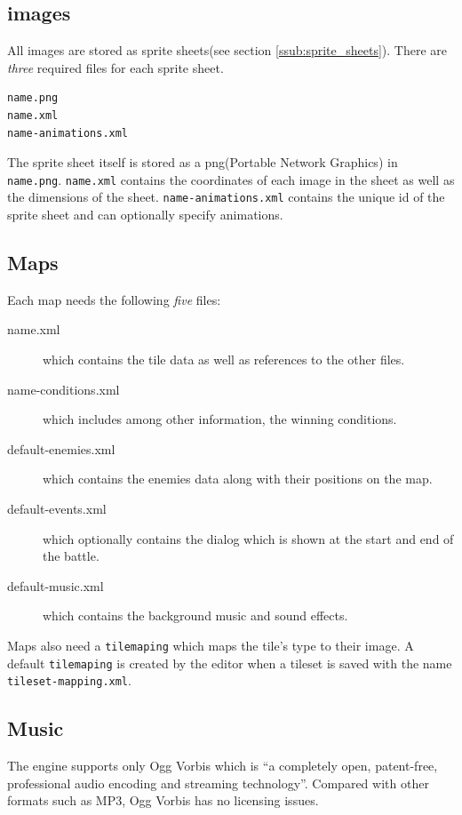 \subsection{images}
All images are stored as sprite sheets(see section \ref{ssub:sprite_sheets}).  There are \emph{three} required files for each sprite sheet. 
\begin{lstlisting}
name.png
name.xml
name-animations.xml
\end{lstlisting}
The sprite sheet itself is stored as  a png(Portable Network Graphics) in \texttt{name.png}. \texttt{name.xml} contains the coordinates of each image in the sheet as well as the dimensions of the sheet. \texttt{name-animations.xml} contains the unique id of the sprite sheet and can optionally specify animations. 

\subsection{Maps}
\label{sub:amaps}

Each map needs the following \emph{five} files:
\begin{description}
	\item[name.xml] which contains the tile data as well as references to the other files. 
	\item[name-conditions.xml]  which includes among other information, the  winning conditions. 
	\item[default-enemies.xml]  which contains the enemies data along with their positions on the map.
	\item[default-events.xml]   which optionally contains the dialog which is shown at the start and end of the battle.
	\item[default-music.xml]    which contains the background music and sound effects.
\end{description}

Maps also need a \texttt{tilemaping} which maps the tile's type to their image.  A default \texttt{tilemaping} is created by the editor when a tileset is saved with the name \texttt{tileset-mapping.xml}.

\subsection{Music}
\label{sub:music}

The engine supports only Ogg Vorbis which is ``a completely open, patent-free, professional audio encoding and streaming technology''\cite{ogg}.
Compared with other formats such as MP3, Ogg Vorbis has no licensing issues. 

